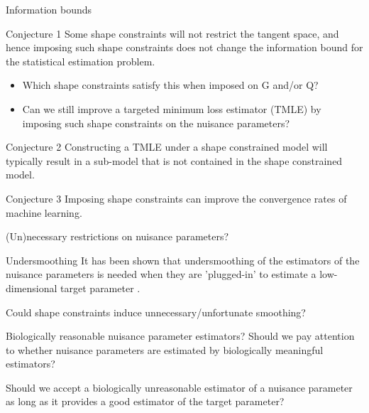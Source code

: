 \documentclass[smaller]{beamer}\usepackage{listings}
\begin{document}
\begin{frame}[label={sec:orgced7abd}]{Information bounds}
\begin{alertblock}{Conjecture 1}
Some shape constraints will not restrict the tangent space, and hence
imposing such shape constraints does not change the information bound
for the statistical estimation problem.

\begin{itemize}
\item Which shape constraints satisfy this when imposed on G and/or Q?
\item Can we still improve a targeted minimum loss estimator (TMLE) by
imposing such shape constraints on the nuisance parameters?
\end{itemize}
\end{alertblock}

\begin{alertblock}{Conjecture 2}
Constructing a TMLE under a shape constrained model will typically
result in a sub-model that is not contained in the shape constrained
model.
\end{alertblock}

\begin{alertblock}{Conjecture 3}
Imposing shape constraints can improve the convergence rates of
machine learning.
\end{alertblock}
\end{frame}

\begin{frame}[label={sec:org4ea5dc6}]{(Un)necessary restrictions on nuisance parameters?}
\begin{block}{Undersmoothing}
It has been shown that undersmoothing of the estimators of the
nuisance parameters is needed when they are 'plugged-in' to estimate a
low-dimensional target parameter
\citep[e.g.,][]{goldstein1996efficient,hjort2001note,van2022efficient}.
\vspace{1em}

\alert{Could shape constraints induce unnecessary/unfortunate smoothing?}
\end{block}

\begin{block}{Biologically reasonable nuisance parameter estimators?}
Should we pay attention to whether nuisance parameters are estimated
by biologically meaningful estimators? \vspace{1em}

Should we accept a biologically unreasonable estimator of a nuisance parameter
as long as it provides a good estimator of the target parameter?
\end{block}
\end{frame}
\end{document}

